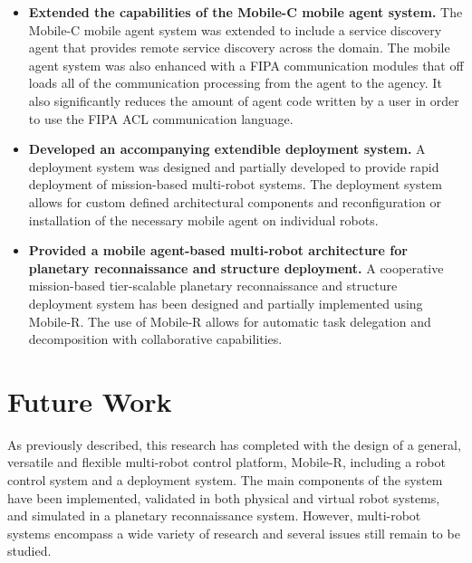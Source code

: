 \begin{itemize}
      \item \textbf{Extended the capabilities of the Mobile-C mobile agent system.}
        The Mobile-C mobile agent system was extended to include a service
          discovery agent that provides remote service discovery
          across the domain.
        The mobile agent system was also enhanced with a FIPA communication
          modules that off loads all of the communication processing from
          the agent to the agency.
        It also significantly reduces the amount of agent code written by a 
          user in order to use the FIPA ACL communication language.

      \item \textbf{Developed an accompanying extendible deployment system.}
        A deployment system was designed and partially developed to provide 
          rapid deployment of mission-based multi-robot systems.
        The deployment system allows for custom defined architectural 
          components and reconfiguration or installation of the necessary
          mobile agent on individual robots.

      \item \textbf{Provided a mobile agent-based multi-robot architecture
                    for planetary reconnaissance and structure deployment.}
        A cooperative mission-based tier-scalable planetary reconnaissance
          and structure deployment system has been designed and partially
          implemented using Mobile-R.
        The use of Mobile-R allows for automatic task delegation and
          decomposition with collaborative capabilities.



    \end{itemize}

  \section{Future Work}

    As previously described, this research has completed with the design of a 
      general, versatile and flexible multi-robot control platform, Mobile-R,
      including a robot control system and a deployment system.
    The main components of the system have been implemented, validated in both 
      physical and virtual robot systems, and simulated in a planetary
      reconnaissance system.
    However, multi-robot systems encompass a wide variety of research and 
      several issues still remain to be studied.

